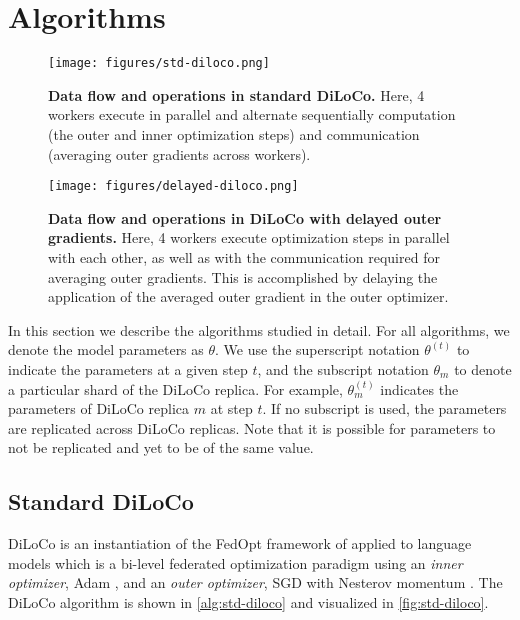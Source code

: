 \section{Algorithms} \label{sec:algorithms}
\begin{figure*}[ht!]
\centering
    \texttt{[image: figures/std-diloco.png]}
    \caption{\textbf{Data flow and operations in standard DiLoCo.} Here, 4 workers execute in parallel and alternate sequentially computation (the outer and inner optimization steps) and communication (averaging outer gradients across workers).}
\label{fig:std-diloco}
\end{figure*} 
\begin{figure*}[ht!]
\centering
    \texttt{[image: figures/delayed-diloco.png]}
    \caption{\textbf{Data flow and operations in DiLoCo with delayed outer gradients.} Here, 4 workers execute optimization steps in parallel with each other, as well as with the communication required for averaging outer gradients. This is accomplished by delaying the application of the averaged outer gradient in the outer optimizer.}
\label{fig:delayed-diloco}
\end{figure*} 
In this section we describe the algorithms studied in detail. For all algorithms, we denote the model parameters as $\theta$. We use the superscript notation $\theta^{(t)}$ to indicate the parameters at a given step $t$, and the subscript notation $\theta_m$ to denote a particular shard of the DiLoCo replica. For example, $\theta^{(t)}_m$ indicates the parameters of DiLoCo replica $m$ at step $t$. If no subscript is used, the parameters are replicated across DiLoCo replicas. Note that it is possible for parameters to not be replicated and yet to be of the same value. 

\subsection{Standard DiLoCo} \label{sec:model_diloco}
DiLoCo is an instantiation of the FedOpt framework of \citet{reddi2021adaptive} applied to language models which is a bi-level federated optimization paradigm using an \emph{inner optimizer}, Adam \citep{kingma2014adam}, and an \emph{outer optimizer}, SGD with Nesterov momentum \citep{sutskever2013nesterov}. The DiLoCo algorithm is shown in \autoref{alg:std-diloco} and visualized in \autoref{fig:std-diloco}.

